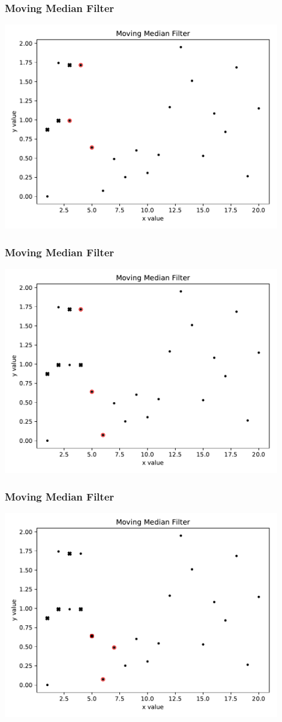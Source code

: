 \documentclass[notes]{beamer}
\begin{document}
\begin{frame}
\frametitle{Moving Median Filter}
\centering
\includegraphics[width=0.9\textwidth]{../med_filt_dem_fig/med_filt_3.pdf}
\end{frame}

\begin{frame}
\frametitle{Moving Median Filter}
\centering
\includegraphics[width=0.9\textwidth]{../med_filt_dem_fig/med_filt_4.pdf}
\end{frame}

\begin{frame}
\frametitle{Moving Median Filter}
\centering
\includegraphics[width=0.9\textwidth]{../med_filt_dem_fig/med_filt_5.pdf}
\end{frame}
\end{document}
